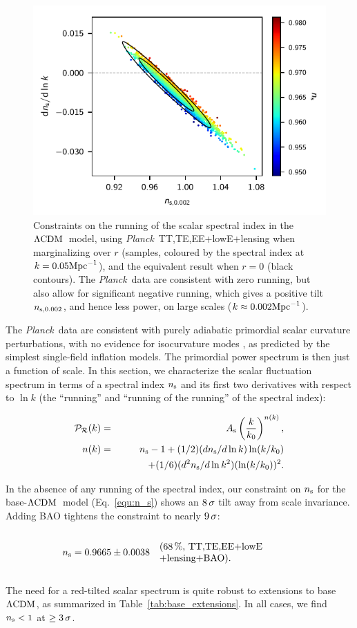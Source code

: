 \documentclass[longauth,traditabstract]{aa}
\def\Planck{\textit{Planck}}
\def\,{\thinspace}
\newcommand{\leftparbox}[2]{\parbox{#1}{\begin{flushleft} #2 \end{flushleft}}}
\newcommand{\oneonesig}[4][5cm]{
\begin{equation}
\left.
  #2 \quad\mbox{\text{\leftparbox{#1}{(68\,\%,~#3)#4}}}
  \right.
\end{equation}
}
\newcommand{\mksym}[1]{\ifmmode {\rm #1}\else #1\fi}
\newcommand{\dataplus}{\allowbreak+}
\newcommand{\BAO}{\mksym{BAO}}
\newcommand{\lensing}{\mksym{lensing}}
\newcommand{\TTTEEE}{\mksym{TT,TE,EE}}
\newcommand{\planckTTTEEEonly}{\planck\ \TTTEEE}
\newcommand{\lowE}{\mksym{lowE}}
\newcommand{\planckall}{\planckTTTEEEonly\dataplus\lowE}
\newcommand{\shortall}{\TTTEEE\dataplus\lowE}
\newcommand{\As}{A_{\rm s}}
\newcommand{\ns}{n_{\rm s}}
\newcommand{\lcdm}{\texorpdfstring{{$\rm{\Lambda CDM}$}}{ΛCDM}}
\newcommand{\nrun}{d \ns / d\ln k}
\newcommand{\nrunrun}{d^2 \ns / d\ln k^2}
\providecommand{\text}[1]{\rm{#1}}
\newcommand{\Mpc}{\text{Mpc}}
\providecommand{\LCDM}{{$\rm{\Lambda CDM}$}}
\newcommand{\clp}{\mathcal{P}}
\newcommand{\clr}{\mathcal{R}}
\def\beglet{
  \addtocounter{equation}{1}%
  \setcounter{parentequation}{\value{equation}}%
  \setcounter{equation}{0}%
  \def\theequation{\arabic{parentequation}\alph{equation}}%
  \ignorespaces
}
\def\endlet{
  \setcounter{equation}{\value{parentequation}}%
  \def\theequation{\arabic{equation}}%
}
\providecommand{\beglet}{\begin{subequations}}
\providecommand{\endlet}{\end{subequations}}
\newcommand{\planck}{\Planck}
\begin{document}
\begin{figure}
\centering
\includegraphics[]{nrun_ns.pdf}
\caption{
Constraints on the running of the scalar spectral index
in the \lcdm\ model, using \planckall+lensing when marginalizing over $r$ (samples,
coloured by the spectral index at $k = 0.05\Mpc^{-1}$), and the equivalent result
when $r=0$ (black contours). The \planck\ data are consistent
with zero running, but also allow for significant negative
running, which gives a positive tilt $n_{{\rm s},0.002}$, and hence less power,
 on large scales ($k \approx 0.002\Mpc^{-1}$).
\label{fig:nrun_ns}
}
\end{figure}

The \planck\ data are consistent with purely adiabatic primordial scalar curvature perturbations, with no evidence for isocurvature modes \citep[see][]{planck2016-l10}, as predicted by the simplest single-field inflation models. The primordial power spectrum is then just a function of scale. In this
section, we characterize the scalar fluctuation spectrum in terms of a spectral
index $\ns$ and its first two derivatives with respect to $\ln k$ (the ``running'' and ``running of the running'' of the spectral index):
\beglet
\begin{eqnarray}
  \clp_\clr(k) &=& \As \left(\frac{k}{k_0}\right)^{n(k)}, \\
  n(k) & = & \ns-1+(1/2)(\nrun) \ln(k/k_0) \nonumber \\
       &   &  \hspace{10mm} + (1/6)(\nrunrun) (\ln(k/k_0))^2. \label{PS1}
\end{eqnarray}
\endlet

In the absence of any running of the spectral index, our constraint on $\ns$
for the base-\LCDM\ model (Eq.~\ref{equ:n_s}) shows an $8\,\sigma$ tilt away from scale invariance. Adding BAO tightens the constraint to nearly $9\,\sigma$:
\oneonesig{\ns = 0.9665\pm 0.0038}{\shortall\dataplus\lensing\dataplus\BAO}{.}
The need for a red-tilted scalar spectrum is quite robust to
extensions to base \lcdm, as summarized in Table~\ref{tab:base_extensions}.
In all cases, we find $\ns <1$ at $\geq3\,\sigma$.
\end{document}
